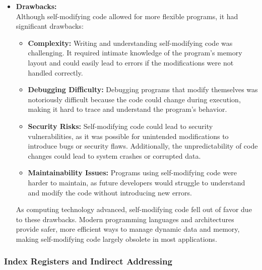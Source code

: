 \documentclass{book}
\begin{document}
\begin{itemize}
		\item \textbf{Drawbacks:} \\
		Although self-modifying code allowed for more flexible programs, it had significant drawbacks:
		\begin{itemize}
			\item \textbf{Complexity:} Writing and understanding self-modifying code was challenging. It required intimate knowledge of the program's memory layout and could easily lead to errors if the modifications were not handled correctly.
			\item \textbf{Debugging Difficulty:} Debugging programs that modify themselves was notoriously difficult because the code could change during execution, making it hard to trace and understand the program's behavior.
			\item \textbf{Security Risks:} Self-modifying code could lead to security vulnerabilities, as it was possible for unintended modifications to introduce bugs or security flaws. Additionally, the unpredictability of code changes could lead to system crashes or corrupted data.
			\item \textbf{Maintainability Issues:} Programs using self-modifying code were harder to maintain, as future developers would struggle to understand and modify the code without introducing new errors.
		\end{itemize}
		
		As computing technology advanced, self-modifying code fell out of favor due to these drawbacks. Modern programming languages and architectures provide safer, more efficient ways to manage dynamic data and memory, making self-modifying code largely obsolete in most applications.
	\end{itemize}
	\subsubsection{Index Registers and Indirect Addressing}
		
\end{document}
